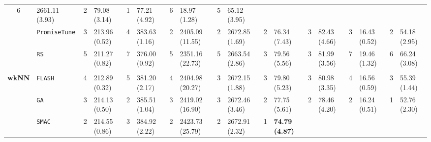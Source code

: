 \begin{tabular}{clllllllllllllllll}
  6 &
  \multicolumn{1}{l|}{2661.11 (3.93)} &
  2 &
  \multicolumn{1}{l|}{79.08 (3.14)} &
  \cellcolor{blue!15}1 &
  \multicolumn{1}{l|}{\cellcolor{blue!15}77.21 (4.92)} &
  6 &
  \multicolumn{1}{l|}{18.97 (1.28)} &
  5 &
  65.12 (3.95) \\
\multicolumn{1}{c|}{} &
  \multicolumn{1}{l|}{\texttt{PromiseTune}} &
  3 &
  \multicolumn{1}{l|}{213.96 (0.52)} &
  4 &
  \multicolumn{1}{l|}{383.63 (1.16)} &
  2 &
  \multicolumn{1}{l|}{2405.09 (11.55)} &
  2 &
  \multicolumn{1}{l|}{2672.85 (1.69)} &
  2 &
  \multicolumn{1}{l|}{76.34 (7.43)} &
  3 &
  \multicolumn{1}{l|}{82.43 (4.66)} &
  3 &
  \multicolumn{1}{l|}{16.43 (0.52)} &
  2 &
  54.18 (2.95) \\
\multicolumn{1}{c|}{} &
  \multicolumn{1}{l|}{\texttt{RS}} &
  5 &
  \multicolumn{1}{l|}{211.27 (0.82)} &
  7 &
  \multicolumn{1}{l|}{376.00 (0.92)} &
  5 &
  \multicolumn{1}{l|}{2351.16 (22.73)} &
  5 &
  \multicolumn{1}{l|}{2663.54 (2.86)} &
  3 &
  \multicolumn{1}{l|}{79.56 (5.56)} &
  3 &
  \multicolumn{1}{l|}{81.99 (3.56)} &
  7 &
  \multicolumn{1}{l|}{19.46 (1.32)} &
  6 &
  66.24 (3.08) \\
\hline
\multicolumn{1}{l}{\textbf{}} &
    &
    &
    &
    &
    &
    &
    &
    &
    &
    &
    &
    &
    &
    &
    &
    &
    \\ \hline
\multicolumn{1}{c|}{\multirow{7}{*}{\textbf{wkNN}}} &
  \multicolumn{1}{l|}{\texttt{FLASH}} &
  4 &
  \multicolumn{1}{l|}{212.89 (0.32)} &
  5 &
  \multicolumn{1}{l|}{381.20 (2.17)} &
  4 &
  \multicolumn{1}{l|}{2404.98 (20.27)} &
  3 &
  \multicolumn{1}{l|}{2672.15 (1.88)} &
  3 &
  \multicolumn{1}{l|}{79.80 (5.23)} &
  3 &
  \multicolumn{1}{l|}{80.98 (3.35)} &
  4 &
  \multicolumn{1}{l|}{16.56 (0.59)} &
  3 &
  55.39 (1.44) \\
\multicolumn{1}{c|}{} &
  \multicolumn{1}{l|}{\texttt{GA}} &
  3 &
  \multicolumn{1}{l|}{214.13 (0.50)} &
  2 &
  \multicolumn{1}{l|}{385.51 (1.04)} &
  3 &
  \multicolumn{1}{l|}{2419.02 (16.90)} &
  3 &
  \multicolumn{1}{l|}{2672.46 (3.46)} &
  2 &
  \multicolumn{1}{l|}{77.75 (5.61)} &
  2 &
  \multicolumn{1}{l|}{78.46 (4.20)} &
  2 &
  \multicolumn{1}{l|}{16.24 (0.51)} &
  \cellcolor{blue!15}1 &
  \cellcolor{blue!15}52.76 (2.30) \\
\multicolumn{1}{c|}{} &
  \multicolumn{1}{l|}{\texttt{SMAC}} &
  2 &
  \multicolumn{1}{l|}{214.55 (0.86)} &
  3 &
  \multicolumn{1}{l|}{384.92 (2.22)} &
  2 &
  \multicolumn{1}{l|}{2423.73 (25.79)} &
  2 &
  \multicolumn{1}{l|}{2672.91 (2.32)} &
  \cellcolor{blue!15}1 &
  \multicolumn{1}{l|}{\cellcolor{blue!15}\textbf{74.79 (4.87)}} &

\end{tabular}
